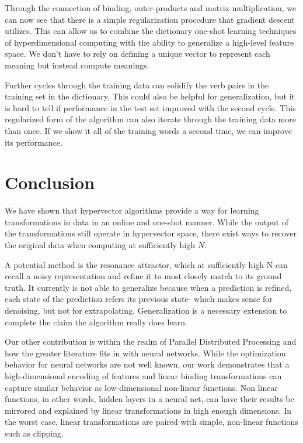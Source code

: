 \documentclass{article}
\begin{document}
Through the connection of binding, outer-products and matrix multiplication, we can now see that there is a simple regularization procedure that gradient descent utilizes. This can allow us to combine the dictionary one-shot learning techniques of hyperdimensional computing with the ability to generalize a high-level feature space. We don't have to rely on defining a unique vector to represent each meaning but instead compute meanings. 

Further cycles through the training data can solidify the verb pairs in the training set in the dictionary. This could also be helpful for generalization, but it is hard to tell if performance in the test set improved with the second cycle.  This regularized form of the algorithm can also iterate through the training data more than once. If we show it all of the training words a second time, we can improve its performance.

\section{Conclusion}
We have shown that hypervector algorithms provide a way for learning transformations in data in an online and one-shot manner. While the output of the transformations still operate in hypervector space, there exist ways to recover the original data when computing at sufficiently high $N$. 

A potential method is the resonance attractor, which at sufficiently high N can recall a noisy representation and refine it to most closely match to its ground truth. It currently is not able to generalize because when a prediction is refined, each state of the prediction refers its previous state- which makes sense for denoising, but not for extrapolating. Generalization is a necessary extension to complete the claim the algorithm really does learn.

Our other contribution is within the realm of Parallel Distributed Processing and how the greater literature fits in with neural networks. While the optimization behavior for neural networks are not well known, our work demonstrates that a high-dimensional encoding of features and linear binding transformations can capture similar behavior as low-dimensional non-linear functions. Non linear functions, in other words, hidden layers in a neural net, can have their results be mirrored and explained by linear transformations in high enough dimensions. In the worst case, linear transformations are paired with simple, non-linear functions such as clipping. 
\end{document}
